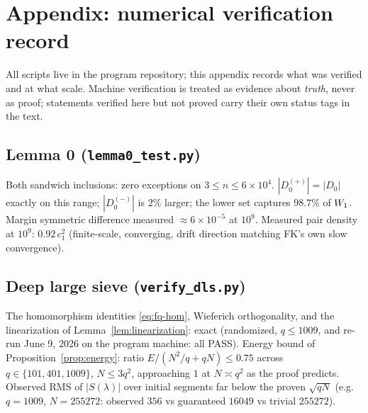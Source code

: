 \section{Appendix: numerical verification record}\label{app:numerics}

All scripts live in the program repository; this appendix records what
was verified and at what scale. Machine verification is treated as
evidence about \emph{truth}, never as proof; statements verified here
but not proved carry their own status tags in the text.

\subsection*{Lemma 0 (\texttt{lemma0\_test.py})}
Both sandwich inclusions: zero exceptions on $3\le n\le6\times10^4$.
$|D_0^{(+)}|=|D_0|$ exactly on this range; $|D_0^{(-)}|$ is $2\%$
larger; the lower set captures $98.7\%$ of $W_1$. Margin symmetric
difference measured $\approx6\times10^{-5}$ at $10^9$. Measured pair
density at $10^9$: $0.92\,c_1^2$ (finite-scale, converging, drift
direction matching FK's own slow convergence).

\subsection*{Deep large sieve (\texttt{verify\_dls.py})}
The homomorphism identities \eqref{eq:fq-hom}, Wieferich orthogonality,
and the linearization of Lemma~\ref{lem:linearization}: exact (randomized,
$q\le1009$, and re-run June 9, 2026 on the program machine: all PASS).
Energy bound of Proposition~\ref{prop:energy}: ratio
$E/(N^2/q+qN)\le0.75$ across $q\in\{101,401,1009\}$, $N\le3q^2$,
approaching $1$ at $N\asymp q^2$ as the proof predicts. Observed RMS of
$|S(\lambda)|$ over initial segments far below the proven $\sqrt{qN}$
(e.g.\ $q=1009$, $N=255272$: observed $356$ vs guaranteed $16049$ vs
trivial $255272$).

